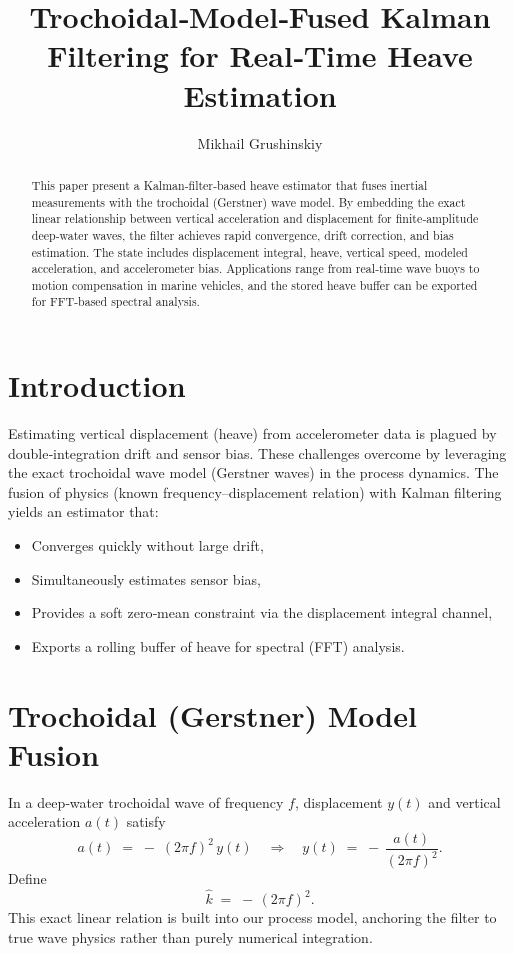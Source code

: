 \documentclass[12pt,letterpaper]{article}
\title{Trochoidal‐Model‐Fused Kalman Filtering for Real‐Time Heave Estimation}
\author{Mikhail Grushinskiy}
\affil{Independent Researcher, 2025}
\begin{document}
\maketitle

\begin{abstract}
This paper present a Kalman‐filter‐based heave estimator that fuses inertial measurements with the trochoidal (Gerstner) wave model.  By embedding the exact linear relationship between vertical acceleration and displacement for finite‐amplitude deep‐water waves, the filter achieves rapid convergence, drift correction, and bias estimation.  The state includes displacement integral, heave, vertical speed, modeled acceleration, and accelerometer bias.  Applications range from real‐time wave buoys to motion compensation in marine vehicles, and the stored heave buffer can be exported for FFT‐based spectral analysis.
\end{abstract}

\section{Introduction}
Estimating vertical displacement (heave) from accelerometer data is plagued by double‐integration drift and sensor bias.  These challenges overcome by leveraging the exact trochoidal wave model (Gerstner waves) in the process dynamics.  The fusion of physics (known frequency–displacement relation) with Kalman filtering yields an estimator that:
\begin{itemize}
  \item Converges quickly without large drift,
  \item Simultaneously estimates sensor bias,
  \item Provides a soft zero‐mean constraint via the displacement integral channel,
  \item Exports a rolling buffer of heave for spectral (FFT) analysis.
\end{itemize}

\section{Trochoidal (Gerstner) Model Fusion}
In a deep‐water trochoidal wave of frequency \(f\), displacement \(y(t)\) and vertical acceleration \(a(t)\) satisfy
\[
a(t) \;=\; -\;(2\pi f)^2\,y(t)\quad\Longrightarrow\quad
y(t) \;=\; -\,\frac{a(t)}{(2\pi f)^2}.
\]
Define
\[
\hat{k} \;=\; -\,(2\pi f)^2.
\]
This exact linear relation is built into our process model, anchoring the filter to true wave physics rather than purely numerical integration.
\end{document}
